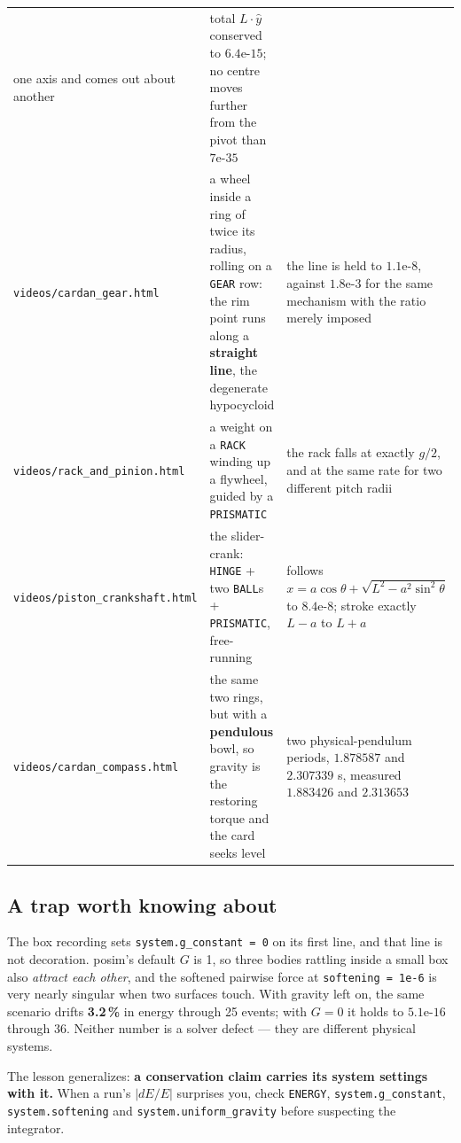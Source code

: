 \documentclass[11pt]{article}
\newcommand{\kw}[1]{\texttt{\uppercase{#1}}}
\newcommand{\code}[1]{\texttt{#1}}
\begin{document}
\begin{center}
\begin{tabular}{p{3.6cm}p{6.4cm}p{4.2cm}}
one axis and comes out about another & total $L\cdot\hat y$ conserved
to $6.4\text{e-}15$; no centre moves further from the pivot than
$7\text{e-}35$\\
\code{videos/cardan\_gear.html} & a wheel inside a ring of twice
its radius, rolling on a \kw{gear} row: the rim point runs along a
\textbf{straight line}, the degenerate hypocycloid & the line is held to
$1.1\text{e-}8$, against $1.8\text{e-}3$ for the same mechanism with the
ratio merely imposed\\
\code{videos/rack\_and\_pinion.html} & a weight on a \kw{rack}
winding up a flywheel, guided by a \kw{prismatic} & the rack falls at
exactly $g/2$, and at the same rate for two different pitch radii\\
\code{videos/piston\_crankshaft.html} & the slider-crank:
\kw{hinge} + two \kw{ball}s + \kw{prismatic}, free-running & follows
$x = a\cos\theta + \sqrt{L^2 - a^2\sin^2\theta}$ to $8.4\text{e-}8$;
stroke exactly $L-a$ to $L+a$\\


\code{videos/cardan\_compass.html} & the same two rings, but with a
\textbf{pendulous} bowl, so gravity is the restoring torque and the
card seeks level & two physical-pendulum periods, $1.878587$ and
$2.307339$ s, measured $1.883426$ and $2.313653$\\
\end{tabular}
\end{center}

\subsection{A trap worth knowing about}

The box recording sets \code{system.g\_constant = 0} on its first line,
and that line is not decoration. posim's default $G$ is 1, so three
bodies rattling inside a small box also \emph{attract each other}, and
the softened pairwise force at \code{softening = 1e-6} is very nearly
singular when two surfaces touch. With gravity left on, the same
scenario drifts \textbf{3.2\,\%} in energy through 25 events; with
$G=0$ it holds to $5.1\text{e-}16$ through 36. Neither number is a
solver defect --- they are different physical systems.

The lesson generalizes: \textbf{a conservation claim carries its system
settings with it.} When a run's $|dE/E|$ surprises you, check
\kw{energy}, \code{system.g\_constant}, \code{system.softening} and
\code{system.uniform\_gravity} before suspecting the integrator.
\end{document}
